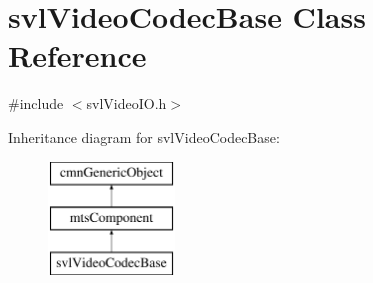 \hypertarget{classsvl_video_codec_base}{\section{svl\-Video\-Codec\-Base Class Reference}
\label{classsvl_video_codec_base}
}


{\ttfamily \#include $<$svl\-Video\-I\-O.\-h$>$}

Inheritance diagram for svl\-Video\-Codec\-Base\-:\begin{figure}[H]
\begin{center}
\leavevmode
\includegraphics[height=3.000000cm]{d8/d39/classsvl_video_codec_base}
\end{center}
\end{figure}

